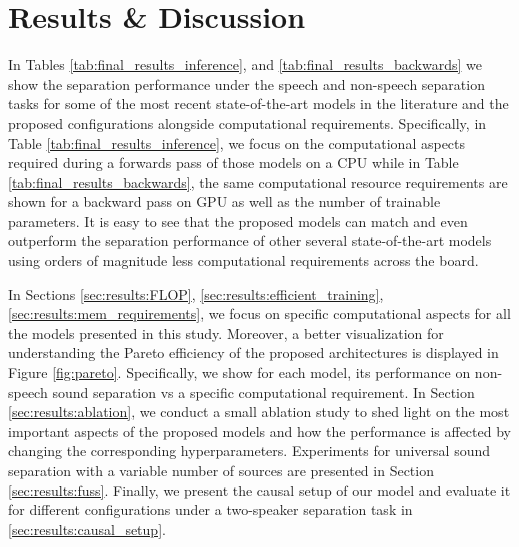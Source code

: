 \section{Results \& Discussion}
\label{sec:results}
In Tables \ref{tab:final_results_inference}, and \ref{tab:final_results_backwards} we show the separation performance under the speech and non-speech separation tasks for some of the most recent state-of-the-art models in the literature and the proposed \sudo configurations alongside computational requirements. Specifically, in Table \ref{tab:final_results_inference}, we focus on the computational aspects required during a forwards pass of those models on a CPU while in Table \ref{tab:final_results_backwards}, the same computational resource requirements are shown for a backward pass on GPU as well as the number of trainable parameters. It is easy to see that the proposed models can match and even outperform the separation performance of other several state-of-the-art models using orders of magnitude less computational requirements across the board.

In Sections \ref{sec:results:FLOP}, \ref{sec:results:efficient_training}, \ref{sec:results:mem_requirements}, we focus on specific computational aspects for all the models presented in this study. Moreover, a better visualization for understanding the Pareto efficiency of the proposed architectures is displayed in Figure \ref{fig:pareto}. Specifically, we show for each model, its performance on non-speech sound separation vs a specific computational requirement. In Section \ref{sec:results:ablation}, we conduct a small ablation study to shed light on the most important aspects of the proposed \sudo models and how the performance is affected by changing the corresponding hyperparameters. Experiments for universal sound separation with a variable number of sources are presented in Section \ref{sec:results:fuss}. Finally, we present the causal setup of our model and evaluate it for different configurations under a two-speaker separation task in \ref{sec:results:causal_setup}.   

